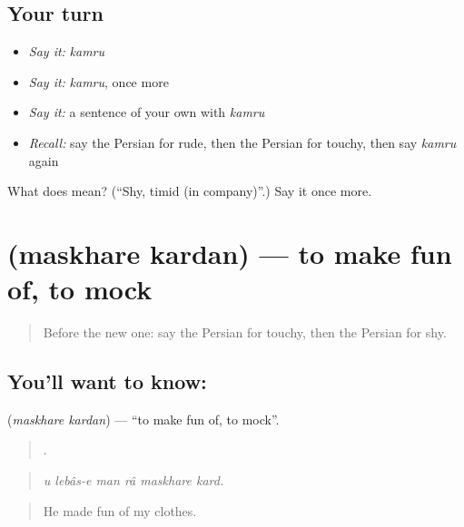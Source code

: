 \subsection*{Your turn}
\begin{itemize}
\raggedright
  \item \emph{Say it:} \emph{kamru}
  \item \emph{Say it:} \emph{kamru}, once more
  \item \emph{Say it:} a sentence of your own with \emph{kamru}
  \item \emph{Recall:} say the Persian for rude, then the Persian for touchy, then say \emph{kamru} again
\end{itemize}

\begin{tcolorbox}[breakable,colback=teal!4,colframe=teal!35!black,title={Before you move on}]
What does  mean? (\textquotedblleft{}Shy, timid (in company)\textquotedblright{}.) Say it once more.
\end{tcolorbox}
\section[\texorpdfstring{\fa{مسخره} \fa{کردن} (maskhare kardan)}{مسخره کردن (maskhare kardan)}]{  (maskhare kardan) — to make fun of, to mock}

\label{lesson:FA-C489-maskhare-kardan}



\begin{quote}
Before the new one: say the Persian for touchy, then the Persian for shy.
\end{quote}

\subsection*{You'll want to know:  }
\textbf{ } (\emph{maskhare kardan}) — \textquotedblleft{}to make fun of, to mock\textquotedblright{}.

\begin{quote}
     .
\end{quote}

\begin{quote}
\emph{u lebâs-e man râ maskhare kard.}
\end{quote}

\begin{quote}
He made fun of my clothes.
\end{quote}

